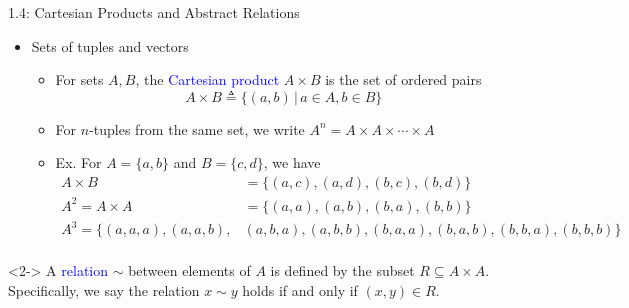 \documentclass[10pt,english,aspectratio=169]{beamer}
\begin{document}
\begin{frame}{1.4: Cartesian Products and Abstract Relations}

\vspace{-2mm}

\begin{itemize}
\setlength\itemsep{3mm}

\item<1-> Sets of tuples and vectors \vspace{1mm}
\begin{itemize}
  \setlength\itemsep{1.5mm}
  \item For sets $A,B$, the \textcolor{blue}{Cartesian product} $A\times B$ is the set of ordered pairs \[ A \times B \triangleq \{(a,b) \,|\, a\in A, b\in B\}\]
  \item For $n$-tuples from the same set, we write $A^n=A\times A \times \cdots \times A$
  \item Ex. For $A  = \{ a,b \}$ and $B  = \{ c,d \}$, we have
\begin{align*}
A\times B &= \{(a,c),(a,d),(b,c),(b,d) \} \\
A^2 = A \times A &= \{ (a,a),(a,b),(b,a),(b,b) \} \\
\!\!\!\!\!\!\!\!\!\!\!\!\!\!\!\!\!\!\! A^3 = \{ (a,a,a),(a,a,b),&(a,b,a),(a,b,b),(b,a,a),(b,a,b),(b,b,a),(b,b,b) \} \\
\end{align*}
\end{itemize}
\end{itemize}
\vspace{-7mm}

\begin{definition}<2->
A \textcolor{blue}{relation} $\sim$ between elements of $A$ is defined by the subset $R \subseteq A\times A$.  Specifically, we say the relation $x \sim y$ holds if and only if $(x,y)\in R$.
\end{definition}



\end{frame}
\end{document}
